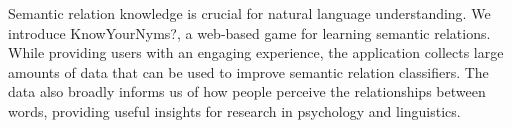 Semantic relation knowledge is crucial for natural language understanding. We introduce KnowYourNyms?, a web-based game for learning semantic relations. While providing users with an engaging experience, the application collects large amounts of data that can be used to improve semantic relation classifiers. The data also broadly informs us of how people perceive the relationships between words, providing useful insights for research in psychology and linguistics.
